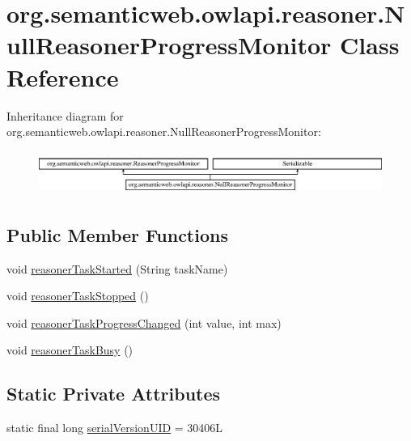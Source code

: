 \hypertarget{classorg_1_1semanticweb_1_1owlapi_1_1reasoner_1_1_null_reasoner_progress_monitor}{\section{org.\-semanticweb.\-owlapi.\-reasoner.\-Null\-Reasoner\-Progress\-Monitor Class Reference}
\label{classorg_1_1semanticweb_1_1owlapi_1_1reasoner_1_1_null_reasoner_progress_monitor}
}
Inheritance diagram for org.\-semanticweb.\-owlapi.\-reasoner.\-Null\-Reasoner\-Progress\-Monitor\-:\begin{figure}[H]
\begin{center}
\leavevmode
\includegraphics[height=1.458333cm]{classorg_1_1semanticweb_1_1owlapi_1_1reasoner_1_1_null_reasoner_progress_monitor}
\end{center}
\end{figure}
\subsection*{Public Member Functions}
\begin{DoxyCompactItemize}
\item 
void \hyperlink{classorg_1_1semanticweb_1_1owlapi_1_1reasoner_1_1_null_reasoner_progress_monitor_abcb784327823e469d8f84d5e36aaf472}{reasoner\-Task\-Started} (String task\-Name)
\item 
void \hyperlink{classorg_1_1semanticweb_1_1owlapi_1_1reasoner_1_1_null_reasoner_progress_monitor_a9cbad0f093328cf7ab2d64e9b96d555f}{reasoner\-Task\-Stopped} ()
\item 
void \hyperlink{classorg_1_1semanticweb_1_1owlapi_1_1reasoner_1_1_null_reasoner_progress_monitor_a5361069a101a3d4a8900e0ceb79135c3}{reasoner\-Task\-Progress\-Changed} (int value, int max)
\item 
void \hyperlink{classorg_1_1semanticweb_1_1owlapi_1_1reasoner_1_1_null_reasoner_progress_monitor_a92975947bf3f24d42046248fd8fc7d9a}{reasoner\-Task\-Busy} ()
\end{DoxyCompactItemize}
\subsection*{Static Private Attributes}
\begin{DoxyCompactItemize}
\item 
static final long \hyperlink{classorg_1_1semanticweb_1_1owlapi_1_1reasoner_1_1_null_reasoner_progress_monitor_a882c6b028798523189dd787426522685}{serial\-Version\-U\-I\-D} = 30406\-L
\end{DoxyCompactItemize}
